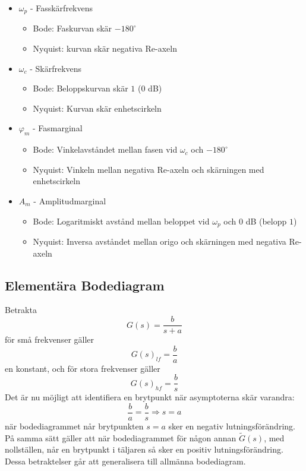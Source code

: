 \documentclass[12pt]{article}
\begin{document}
\begin{itemize}
\item $\omega_p$ - Fasskärfrekvens \\
\begin{itemize}
 \item Bode: Faskurvan skär $-180 ^{\circ}$ 
 \item Nyquist: kurvan skär negativa Re-axeln
\end{itemize}
\item $\omega_c$ - Skärfrekvens \\
\begin{itemize}
\item Bode: Beloppskurvan skär $1$ ($0$ dB) 
\item Nyquist: Kurvan skär enhetscirkeln
\end{itemize}
\item $\varphi_m$ - Fasmarginal
\begin{itemize}
\item Bode: Vinkelavståndet mellan fasen vid $\omega_c$ och $-180 ^{\circ}$
\item Nyquist: Vinkeln mellan negativa Re-axeln och skärningen med enhetscirkeln
\end{itemize}
\item $A_m$ - Amplitudmarginal
\begin{itemize}
\item Bode: Logaritmiskt avstånd mellan beloppet vid $\omega_p$ och $0$ dB (belopp $1$)
\item Nyquist: Inversa avståndet mellan origo och skärningen med negativa Re-axeln
\end{itemize}



\end{itemize}




\subsection*{Elementära Bodediagram}
Betrakta 
\[G(s) = \frac{b}{s+a}\]
för små frekvenser gäller 
\[G(s)_{lf} = \frac{b}{a}\]
en konstant, och för stora frekvenser gäller 
\[G(s)_{hf} = \frac{b}{s}\]
Det är nu möjligt att identifiera en brytpunkt när asymptoterna skär varandra: 
\[\frac{b}{a} = \frac{b}{s} \Rightarrow s = a\]
när bodediagrammet når brytpunkten $s = a$ sker en negativ lutningsförändring. På samma sätt gäller att när bodediagrammet för någon annan $\tilde{G}(s)$, med nollställen, når en brytpunkt i täljaren så sker en positiv lutningsförändring. Dessa betraktelser går att generalisera till allmänna bodediagram.
\end{document}

